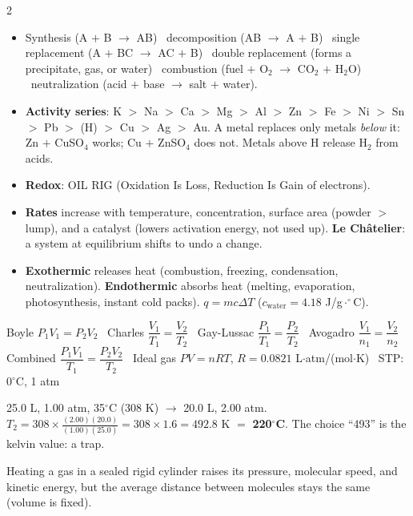 \documentclass[10pt]{article}
\makeatletter
\newcommand{\sub}[1]{\par\vspace{2.5pt}{\sffamily\bfseries\color{dblue}#1}\par\nobreak\vspace{0.5pt}\@afterheading}
\newcommand{\term}[1]{\textbf{\color{dnavy}#1}}
\makeatother
\begin{document}
\begin{multicols}{2}
\sub{G. Reactions}
\begin{itemize}
\item Synthesis (A $+$ B $\to$ AB) \textbullet\ decomposition (AB $\to$ A $+$ B) \textbullet\ single replacement (A $+$ BC $\to$ AC $+$ B) \textbullet\ double replacement (forms a precipitate, gas, or water) \textbullet\ combustion (fuel $+$ O$_2$ $\to$ CO$_2$ $+$ H$_2$O) \textbullet\ neutralization (acid $+$ base $\to$ salt $+$ water).
\item \term{Activity series}: K $>$ Na $>$ Ca $>$ Mg $>$ Al $>$ Zn $>$ Fe $>$ Ni $>$ Sn $>$ Pb $>$ (H) $>$ Cu $>$ Ag $>$ Au. A metal replaces only metals \emph{below} it: Zn $+$ CuSO$_4$ works; Cu $+$ ZnSO$_4$ does not. Metals above H release H$_2$ from acids.
\item \term{Redox}: OIL RIG (Oxidation Is Loss, Reduction Is Gain of electrons).
\item \term{Rates} increase with temperature, concentration, surface area (powder $>$ lump), and a catalyst (lowers activation energy, not used up). \term{Le Ch\^atelier}: a system at equilibrium shifts to undo a change.
\item \term{Exothermic} releases heat (combustion, freezing, condensation, neutralization). \term{Endothermic} absorbs heat (melting, evaporation, photosynthesis, instant cold packs). $q=mc\Delta T$ ($c_\text{water}=4.18$ J/g$\cdot^\circ$C).
\end{itemize}

\sub{H. Gas laws}
\begin{formbox}[Always use kelvins: K $=$ $^\circ$C $+$ 273]
Boyle $P_1V_1=P_2V_2$ \textbullet\ Charles $\dfrac{V_1}{T_1}=\dfrac{V_2}{T_2}$ \textbullet\ Gay-Lussac $\dfrac{P_1}{T_1}=\dfrac{P_2}{T_2}$ \textbullet\ Avogadro $\dfrac{V_1}{n_1}=\dfrac{V_2}{n_2}$\\
Combined $\dfrac{P_1V_1}{T_1}=\dfrac{P_2V_2}{T_2}$ \textbullet\ Ideal gas $PV=nRT$, $R=0.0821$ L$\cdot$atm/(mol$\cdot$K) \textbullet\ STP: 0$^\circ$C, 1 atm
\end{formbox}
\begin{dost}
25.0 L, 1.00 atm, 35$^\circ$C (308 K) $\to$ 20.0 L, 2.00 atm. $T_2=308\times\frac{(2.00)(20.0)}{(1.00)(25.0)}=308\times1.6=492.8$ K $=$ \textbf{220$^\circ$C}. The choice ``493'' is the kelvin value: a trap.
\end{dost}
Heating a gas in a sealed rigid cylinder raises its pressure, molecular speed, and kinetic energy, but the average distance between molecules stays the same (volume is fixed).


\end{multicols}
\end{document}
